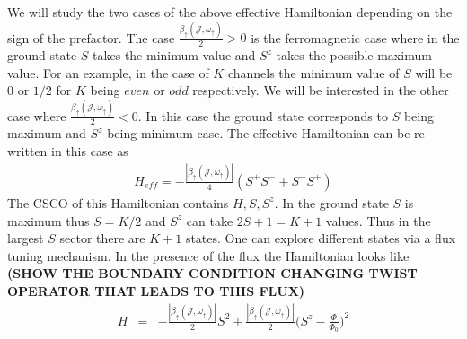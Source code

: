 \documentclass[reprint,prb,superscriptaddress]{revtex4-2}
\begin{document}
We will study the two cases of the above effective Hamiltonian depending on the sign of the prefactor. The case $\frac{\beta_{\uparrow}({\mathcal{J}},\omega_{\uparrow})}{2} >0$ is the ferromagnetic case where in the ground state $S$ takes the minimum value and $S^z$ takes the possible maximum value. For an example, in the case of $K$ channels the minimum value of $S$ will be $0$ or $1/2$ for $K$ being $even $ or $odd$ respectively.  We will be interested in the other case where $\frac{\beta_{\uparrow}({\mathcal{J}},\omega_{\uparrow})}{2} <0$. In this case the ground state corresponds to $S$ being maximum and $S^z$ being minimum case. The effective Hamiltonian can be re-written in this case as
\begin{eqnarray}
H_{eff}   =-\frac{|\beta_{\uparrow}({\mathcal{J}},\omega_{\uparrow})|}{4} (S^+S^{-}+ S^-S^{+})    
\end{eqnarray}
\noindent The CSCO of this Hamiltonian contains $H,S,S^z$. In the ground state $S$ is maximum thus $S=K/2$ and $S^z$ can take $2S+1=K+1$ values. Thus in the largest $S$ sector there are $K+1$ states. One can explore different states via a flux tuning mechanism. In the presence of the flux the Hamiltonian looks like \textbf{(SHOW THE BOUNDARY CONDITION CHANGING TWIST OPERATOR THAT LEADS TO THIS FLUX)}
\begin{eqnarray}
H &=& -\frac{|\beta_{\uparrow}({\mathcal{J}},\omega_{\uparrow})|}{2} S^2   +\frac{|\beta_{\uparrow}({\mathcal{J}},\omega_{\uparrow})|}{2} \bigg(S^{z}-\frac{\Phi}{\Phi_0} \bigg)^2 
\label{eq:flux_spectral}
\end{eqnarray}
\end{document}
